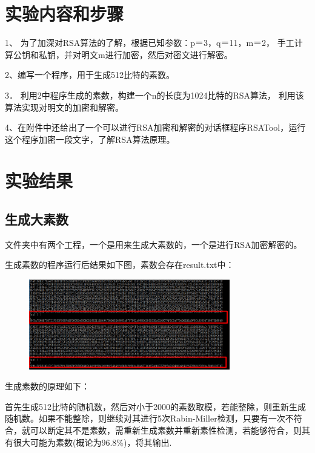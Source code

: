 \documentclass[UTF8,a4paper]{article}
\begin{document}
	\section{实验内容和步骤}
1、	为了加深对RSA算法的了解，根据已知参数：p＝3，q＝11，m＝2，
手工计算公钥和私钥，并对明文m进行加密，然后对密文进行解密。\par 
2、编写一个程序，用于生成512比特的素数。\par 
3．	利用2中程序生成的素数，构建一个n的长度为1024比特的RSA算法，
利用该算法实现对明文的加密和解密。\par 
4、在附件中还给出了一个可以进行RSA加密和解密的对话框程序RSATool，运行这个程序加密一段文字，了解RSA算法原理。\par 



	\section{实验结果}

	
	
\subsection{生成大素数}	
	文件夹中有两个工程，一个是用来生成大素数的，一个是进行RSA加密解密的。
	
生成素数的程序运行后结果如下图，素数会存在result.txt中：

	\begin{figure}[!ht]
	
	\centering
	\includegraphics[width=0.78\textwidth]{prime.PNG}
	
	\label{fig:grade}
\end{figure}

生成素数的原理如下：\par 

首先生成512比特的随机数，然后对小于2000的素数取模，若能整除，则重新生成随机数。如果不能整除，则继续对其进行5次Rabin-Miller检测，只要有一次不符合，就可以断定其不是素数，需重新生成素数并重新素性检测，若能够符合，则其有很大可能为素数(概论为96.8\%)，将其输出.
\end{document}
